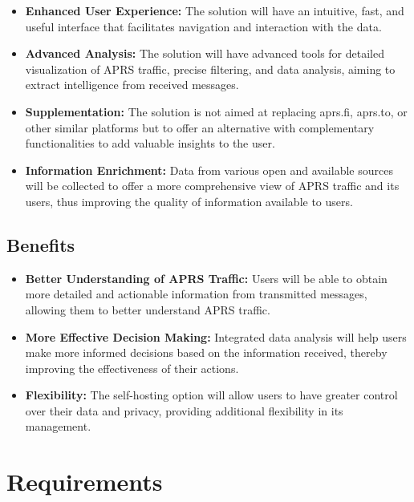 \begin{itemize}
	\item \textbf{Enhanced User Experience:} The solution will have an intuitive, fast, and useful interface that facilitates navigation and interaction with the data.
	
	\item \textbf{Advanced Analysis:} The solution will have advanced tools for detailed visualization of APRS traffic, precise filtering, and data analysis, aiming to extract intelligence from received messages.
	
	\item \textbf{Supplementation:} The solution is not aimed at replacing aprs.fi, aprs.to, or other similar platforms but to offer an alternative with complementary functionalities to add valuable insights to the user.
	
	\item \textbf{Information Enrichment:} Data from various open and available sources will be collected to offer a more comprehensive view of APRS traffic and its users, thus improving the quality of information available to users.
\end{itemize}

\subsection{Benefits}

\begin{itemize}
	\item \textbf{Better Understanding of APRS Traffic:} Users will be able to obtain more detailed and actionable information from transmitted messages, allowing them to better understand APRS traffic.
	
	\item \textbf{More Effective Decision Making:} Integrated data analysis will help users make more informed decisions based on the information received, thereby improving the effectiveness of their actions.
	
	\item \textbf{Flexibility:} The self-hosting option will allow users to have greater control over their data and privacy, providing additional flexibility in its management.
	
\end{itemize}

\section{Requirements}


